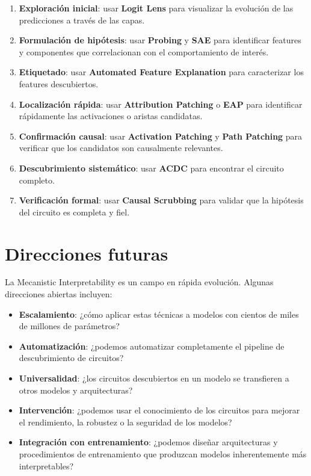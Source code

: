 \documentclass[11pt,a4paper]{report}
\theoremstyle{definition}
\begin{document}
\begin{enumerate}
    \item \textbf{Exploración inicial}: usar \textbf{Logit Lens} para visualizar la evolución de las predicciones a través de las capas.
    \item \textbf{Formulación de hipótesis}: usar \textbf{Probing} y \textbf{SAE} para identificar features y componentes que correlacionan con el comportamiento de interés.
    \item \textbf{Etiquetado}: usar \textbf{Automated Feature Explanation} para caracterizar los features descubiertos.
    \item \textbf{Localización rápida}: usar \textbf{Attribution Patching} o \textbf{EAP} para identificar rápidamente las activaciones o aristas candidatas.
    \item \textbf{Confirmación causal}: usar \textbf{Activation Patching} y \textbf{Path Patching} para verificar que los candidatos son causalmente relevantes.
    \item \textbf{Descubrimiento sistemático}: usar \textbf{ACDC} para encontrar el circuito completo.
    \item \textbf{Verificación formal}: usar \textbf{Causal Scrubbing} para validar que la hipótesis del circuito es completa y fiel.
\end{enumerate}

\section{Direcciones futuras}

La Mecanistic Interpretability es un campo en rápida evolución. Algunas direcciones abiertas incluyen:

\begin{itemize}
    \item \textbf{Escalamiento}: ¿cómo aplicar estas técnicas a modelos con cientos de miles de millones de parámetros?
    \item \textbf{Automatización}: ¿podemos automatizar completamente el pipeline de descubrimiento de circuitos?
    \item \textbf{Universalidad}: ¿los circuitos descubiertos en un modelo se transfieren a otros modelos y arquitecturas?
    \item \textbf{Intervención}: ¿podemos usar el conocimiento de los circuitos para mejorar el rendimiento, la robustez o la seguridad de los modelos?
    \item \textbf{Integración con entrenamiento}: ¿podemos diseñar arquitecturas y procedimientos de entrenamiento que produzcan modelos inherentemente más interpretables?
\end{itemize}
\end{document}
